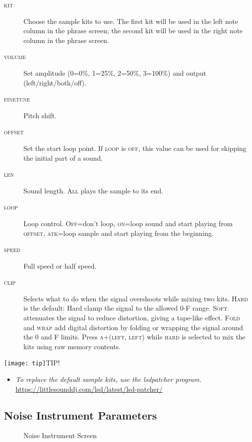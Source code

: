 \begin{description}
	\item[\textsc{kit}] Choose the sample kits to use. The first kit will be used in the left note column in the phrase screen; the second kit will be used in the right note column in the phrase screen.
    \item[\textsc{volume}] Set amplitude (0=0\%, 1=25\%, 2=50\%, 3=100\%) and output (left/right/both/off).
	\item[\textsc{finetune}] Pitch shift.
	\item[\textsc{offset}] Set the start loop point. If \textsc{loop} is \textsc{off}, this value can be used for skipping the initial part of a sound.
	\item[\textsc{len}] Sound length. \textsc{All} plays the sample to its end.
	\item[\textsc{loop}] Loop control. \textsc{Off}=don't loop, \textsc{on}=loop sound and start playing from \textsc{offset}, \textsc{atk}=loop sample and start playing from the beginning.
	\item[\textsc{speed}] Full speed or half speed.
	\item[\textsc{clip}] Selects what to do when the signal overshoots while mixing two kits. \textsc{Hard} is the default: Hard clamp the signal to the allowed 0-F range. \textsc{Soft} attenuates the signal to reduce distortion, giving a tape-like effect. \textsc{Fold} and \textsc{wrap} add digital distortion by folding or wrapping the signal around the 0 and F limits. Press \textsc{a+(left, left)} while \textsc{hard} is selected to mix the kits using raw memory contents.
\end{description}

\texttt{[image: tip]}TIP!
\begin{itemize}
\item \textit{To replace the default sample kits, use the lsdpatcher program.} \url{https://littlesounddj.com/lsd/latest/lsd-patcher/}
\end{itemize}

\subsection{Noise Instrument Parameters}
\label{noise-instrument-parameters}

\begin{figure}[htpb]
	\begin{center}
	\end{center}
	\caption{Noise Instrument Screen}
	\label{fig:instr-noise}
\end{figure}

